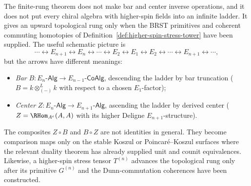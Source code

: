 \begin{remark}
\label{rem:operadic-spiral}
%
%
%
The finite-rung theorem does not make bar and center inverse
operations, and it does not put every chiral algebra with
higher-spin fields into an infinite ladder. It gives an
upward topological rung only when the BRST primitives and
coherent commuting homotopies of
Definition~\ref{def:higher-spin-stress-tower} have been
supplied. The useful schematic picture is
\[
 \cdots \longleftrightarrow E_{n+1}
 \longleftrightarrow E_n
 \longleftrightarrow \cdots
 \longleftrightarrow E_2
 \longleftrightarrow E_1
 \longleftrightarrow E_2
 \longleftrightarrow \cdots
 \longleftrightarrow E_{n+1}
 \longleftrightarrow \cdots,
\]
but the arrows have different meanings:
\begin{itemize}
\item \emph{Bar} $B\colon E_n\text{-}\mathsf{Alg} \to
 E_{n-1}\text{-}\mathsf{CoAlg}$, descending the ladder by
 bar truncation ($B = k \otimes^L_{(-)} k$ with respect to
 a chosen $E_1$-factor);
\item \emph{Center} $Z\colon E_n\text{-}\mathsf{Alg} \to
 E_{n+1}\text{-}\mathsf{Alg}$, ascending the ladder by
 derived center ($Z = \RHom_{A^e}(A,A)$ with its higher
 Deligne $E_{n+1}$-structure).
\end{itemize}
The composites $Z\circ B$ and $B\circ Z$ are not identities
in general. They become comparison maps only on the stable
Koszul or Poincar\'e--Koszul surfaces where the relevant
duality theorem has already supplied unit and counit
equivalences. Likewise, a higher-spin stress tensor
$T^{(n)}$ advances the topological rung only after its
primitive $G^{(n)}$ and the Dunn-commutation coherences have
been constructed.
\end{remark}

